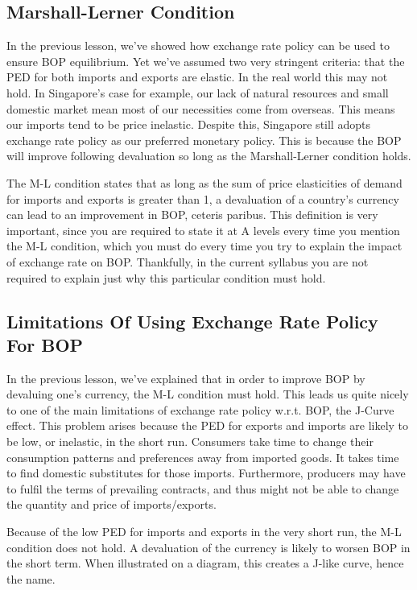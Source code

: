 \documentclass[DIV=classic,11pt,numbers=noenddot,parskip]{scrartcl}
\begin{document}
\subsection{Marshall-Lerner Condition}
In the previous lesson, we’ve showed how exchange rate policy can be used to ensure BOP equilibrium. Yet we’ve assumed two very stringent criteria: that the PED for both imports and exports are elastic. In the real world this may not hold. In Singapore’s case for example, our lack of natural resources and small domestic market mean most of our necessities come from overseas. This means our imports tend to be price inelastic. Despite this, Singapore still adopts exchange rate policy as our preferred monetary policy. This is because the BOP will improve following devaluation so long as the Marshall-Lerner condition holds.

The M-L condition states that as long as the sum of price elasticities of demand for imports and exports is greater than 1, a devaluation of a country’s currency can lead to an improvement in BOP, ceteris paribus. This definition is very important, since you are required to state it at A levels every time you mention the M-L condition, which you must do every time you try to explain the impact of exchange rate on BOP. Thankfully, in the current syllabus you are not required to explain just why this particular condition must hold.
\subsection{Limitations Of Using Exchange Rate Policy For BOP}
In the previous lesson, we’ve explained that in order to improve BOP by devaluing one’s currency, the M-L condition must hold. This leads us quite nicely to one of the main limitations of exchange rate policy w.r.t. BOP, the J-Curve effect. This problem arises because the PED for exports and imports are likely to be low, or inelastic, in the short run. Consumers take time to change their consumption patterns and preferences away from imported goods. It takes time to find domestic substitutes for those imports. Furthermore, producers may have to fulfil the terms of prevailing contracts, and thus might not be able to change the quantity and price of imports/exports.

Because of the low PED for imports and exports in the very short run, the M-L condition does not hold. A devaluation of the currency is likely to worsen BOP in the short term. When illustrated on a diagram, this creates a J-like curve, hence the name.
\end{document}

